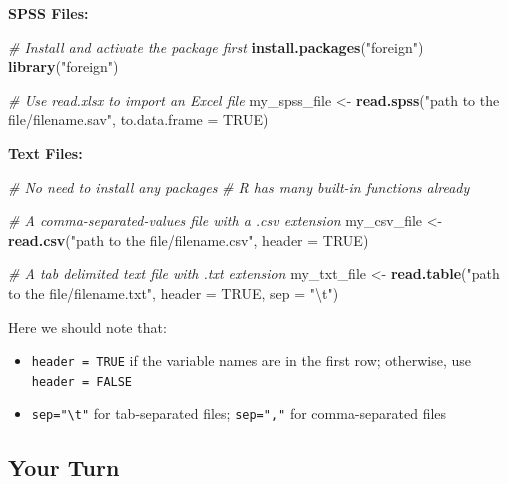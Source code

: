 \documentclass[]{book}
\newenvironment{Shaded}{\begin{snugshade}}{\end{snugshade}}
\newcommand{\CharTok}[1]{\textcolor[rgb]{0.31,0.60,0.02}{#1}}
\newcommand{\CommentTok}[1]{\textcolor[rgb]{0.56,0.35,0.01}{\textit{#1}}}
\newcommand{\DataTypeTok}[1]{\textcolor[rgb]{0.13,0.29,0.53}{#1}}
\newcommand{\KeywordTok}[1]{\textcolor[rgb]{0.13,0.29,0.53}{\textbf{#1}}}
\newcommand{\NormalTok}[1]{#1}
\newcommand{\OtherTok}[1]{\textcolor[rgb]{0.56,0.35,0.01}{#1}}
\newcommand{\StringTok}[1]{\textcolor[rgb]{0.31,0.60,0.02}{#1}}
\providecommand{\tightlist}{%
  \setlength{\itemsep}{0pt}\setlength{\parskip}{0pt}}
\begin{document}
\textbf{SPSS Files:}

\begin{Shaded}
\begin{Highlighting}[]
\CommentTok{# Install and activate the package first}
\KeywordTok{install.packages}\NormalTok{(}\StringTok{"foreign"}\NormalTok{)}
\KeywordTok{library}\NormalTok{(}\StringTok{"foreign"}\NormalTok{)}

\CommentTok{# Use read.xlsx to import an Excel file}
\NormalTok{my_spss_file <-}\StringTok{ }\KeywordTok{read.spss}\NormalTok{(}\StringTok{"path to the file/filename.sav"}\NormalTok{, }\DataTypeTok{to.data.frame =} \OtherTok{TRUE}\NormalTok{)}
\end{Highlighting}
\end{Shaded}

\textbf{Text Files:}

\begin{Shaded}
\begin{Highlighting}[]
\CommentTok{# No need to install any packages}
\CommentTok{# R has many built-in functions already}

\CommentTok{# A comma-separated-values file with a .csv extension}
\NormalTok{my_csv_file <-}\StringTok{ }\KeywordTok{read.csv}\NormalTok{(}\StringTok{"path to the file/filename.csv"}\NormalTok{, }\DataTypeTok{header =} \OtherTok{TRUE}\NormalTok{)}

\CommentTok{# A tab delimited text file with .txt extension}
\NormalTok{my_txt_file <-}\StringTok{ }\KeywordTok{read.table}\NormalTok{(}\StringTok{"path to the file/filename.txt"}\NormalTok{, }\DataTypeTok{header =} \OtherTok{TRUE}\NormalTok{, }\DataTypeTok{sep =} \StringTok{"}\CharTok{\textbackslash{}t}\StringTok{"}\NormalTok{)}
\end{Highlighting}
\end{Shaded}

Here we should note that:

\begin{itemize}
\tightlist
\item
  \texttt{header\ =\ TRUE} if the variable names are in the first row; otherwise, use \texttt{header\ =\ FALSE}
\item
  \texttt{sep="\textbackslash{}t"} for tab-separated files; \texttt{sep=","} for comma-separated files
\end{itemize}

\hypertarget{your-turn-2}{%
\subsection{Your Turn}\label{your-turn-2}}
\end{document}
